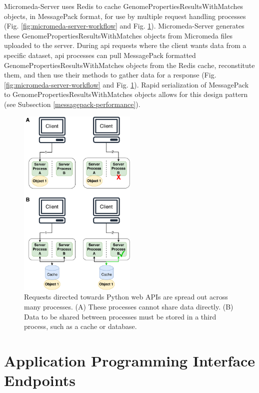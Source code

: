 Micromeda-Server uses Redis to cache GenomePropertiesResultsWithMatches objects, in MessagePack format, for use by multiple request handling processes (Fig. \ref{fig:micromeda-server-workflow} and Fig. \ref{fig:client-processing}). Micromeda-Server generates these GenomePropertiesResultsWithMatches objects from Micromeda files uploaded to the server. During \gls{api} requests where the client wants data from a specific dataset, \gls{api} processes can pull MessagePack formatted GenomePropertiesResultsWithMatches objects from the Redis cache, reconstitute them, and then use their methods to gather data for a response (Fig. \ref{fig:micromeda-server-workflow} and Fig. \ref{endpoints}). Rapid serialization of MessagePack to GenomePropertiesResultsWithMatches objects allows for this design pattern (see Subsection \ref{messagepack-performance}).

\begin{figure}[!ht]
  \centering
	\includegraphics[width=0.50\textwidth]{media/Client-Processing.pdf}
	 \caption{Requests directed towards Python web APIs are spread out across many processes. (A) These processes cannot share data directly. (B) Data to be shared between processes must be stored in a third process, such as a cache or database.}
	 \label{fig:client-processing}
\end{figure}

\section{Application Programming Interface Endpoints} \label{endpoints}

